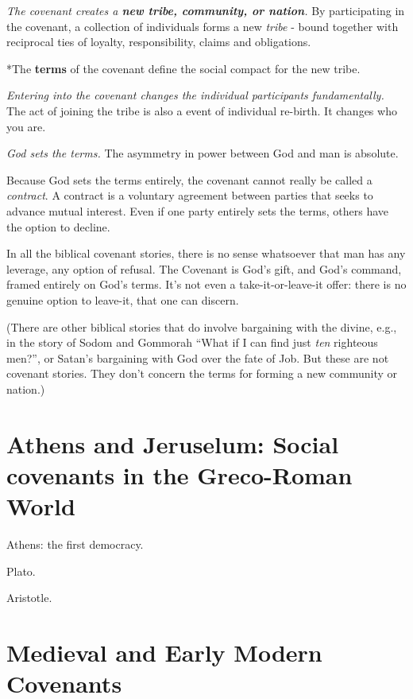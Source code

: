 \documentclass[
]{book}
\begin{document}
\emph{The covenant creates a \textbf{new tribe, community, or nation}.} By participating in the covenant, a collection of individuals forms a new \emph{tribe} - bound together with reciprocal ties of loyalty, responsibility, claims and obligations.

*The \textbf{terms} of the covenant define the social compact for the new tribe.

\emph{Entering into the covenant changes the individual participants fundamentally.} The act of joining the tribe is also a event of individual re-birth. It changes who you are.

\emph{God sets the terms.} The asymmetry in power between God and man is absolute.

Because God sets the terms entirely, the covenant cannot really be called a \emph{contract}. A contract is a voluntary agreement between parties that seeks to advance mutual interest. Even if one party entirely sets the terms, others have the option to decline.

In all the biblical covenant stories, there is no sense whatsoever that man has any leverage, any option of refusal. The Covenant is God's gift, and God's command, framed entirely on God's terms. It's not even a take-it-or-leave-it offer: there is no genuine option to leave-it, that one can discern.

(There are other biblical stories that do involve bargaining with the divine, e.g., in the story of Sodom and Gommorah ``What if I can find just \emph{ten} righteous men?'', or Satan's bargaining with God over the fate of Job. But these are not covenant stories. They don't concern the terms for forming a new community or nation.)

\hypertarget{athens-and-jeruselum-social-covenants-in-the-greco-roman-world}{%
\chapter{Athens and Jeruselum: Social covenants in the Greco-Roman World}\label{athens-and-jeruselum-social-covenants-in-the-greco-roman-world}}

Athens: the first democracy.

Plato.

Aristotle.

\hypertarget{medieval-and-early-modern-covenants}{%
\chapter{Medieval and Early Modern Covenants}\label{medieval-and-early-modern-covenants}}
\end{document}

